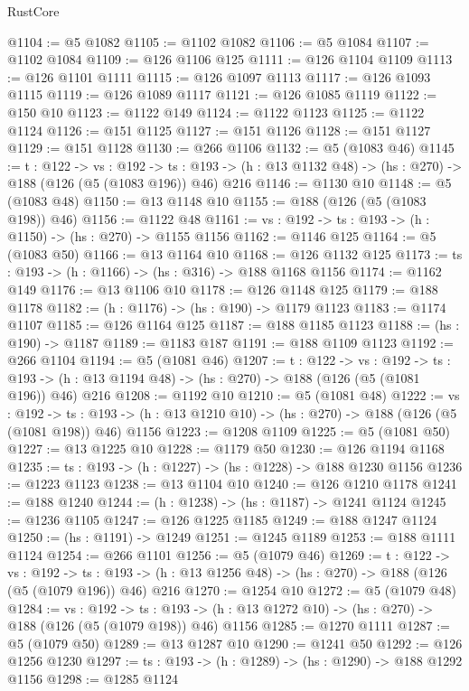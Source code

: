 \begin{lexlean}{RustCore}
\begin{coremodule}
@1104 := @5 @1082
@1105 := @1102 @1082
@1106 := @5 @1084
@1107 := @1102 @1084
@1109 := @126 @1106 @125
@1111 := @126 @1104 @1109
@1113 := @126 @1101 @1111
@1115 := @126 @1097 @1113
@1117 := @126 @1093 @1115
@1119 := @126 @1089 @1117
@1121 := @126 @1085 @1119
@1122 := @150 @10
@1123 := @1122 @149
@1124 := @1122 @1123
@1125 := @1122 @1124
@1126 := @151 @1125
@1127 := @151 @1126
@1128 := @151 @1127
@1129 := @151 @1128
@1130 := @266 @1106
@1132 := @5 (@1083 @46)
@1145 := {t : @122} ->
  {vs : @192} ->
  {ts : @193} -> (h : @13 @1132 @48) -> (hs : @270) -> @188 (@126 (@5 (@1083 @196)) @46) @216
@1146 := @1130 @10
@1148 := @5 (@1083 @48)
@1150 := @13 @1148 @10
@1155 := @188 (@126 (@5 (@1083 @198)) @46)
@1156 := @1122 @48
@1161 := {vs : @192} -> {ts : @193} -> (h : @1150) -> (hs : @270) -> @1155 @1156
@1162 := @1146 @125
@1164 := @5 (@1083 @50)
@1166 := @13 @1164 @10
@1168 := @126 @1132 @125
@1173 := {ts : @193} -> (h : @1166) -> (hs : @316) -> @188 @1168 @1156
@1174 := @1162 @149
@1176 := @13 @1106 @10
@1178 := @126 @1148 @125
@1179 := @188 @1178
@1182 := (h : @1176) -> (hs : @190) -> @1179 @1123
@1183 := @1174 @1107
@1185 := @126 @1164 @125
@1187 := @188 @1185 @1123
@1188 := (hs : @190) -> @1187
@1189 := @1183 @187
@1191 := @188 @1109 @1123
@1192 := @266 @1104
@1194 := @5 (@1081 @46)
@1207 := {t : @122} ->
  {vs : @192} ->
  {ts : @193} -> (h : @13 @1194 @48) -> (hs : @270) -> @188 (@126 (@5 (@1081 @196)) @46) @216
@1208 := @1192 @10
@1210 := @5 (@1081 @48)
@1222 := {vs : @192} ->
  {ts : @193} -> (h : @13 @1210 @10) -> (hs : @270) -> @188 (@126 (@5 (@1081 @198)) @46) @1156
@1223 := @1208 @1109
@1225 := @5 (@1081 @50)
@1227 := @13 @1225 @10
@1228 := @1179 @50
@1230 := @126 @1194 @1168
@1235 := {ts : @193} -> (h : @1227) -> (hs : @1228) -> @188 @1230 @1156
@1236 := @1223 @1123
@1238 := @13 @1104 @10
@1240 := @126 @1210 @1178
@1241 := @188 @1240
@1244 := (h : @1238) -> (hs : @1187) -> @1241 @1124
@1245 := @1236 @1105
@1247 := @126 @1225 @1185
@1249 := @188 @1247 @1124
@1250 := (hs : @1191) -> @1249
@1251 := @1245 @1189
@1253 := @188 @1111 @1124
@1254 := @266 @1101
@1256 := @5 (@1079 @46)
@1269 := {t : @122} ->
  {vs : @192} ->
  {ts : @193} -> (h : @13 @1256 @48) -> (hs : @270) -> @188 (@126 (@5 (@1079 @196)) @46) @216
@1270 := @1254 @10
@1272 := @5 (@1079 @48)
@1284 := {vs : @192} ->
  {ts : @193} -> (h : @13 @1272 @10) -> (hs : @270) -> @188 (@126 (@5 (@1079 @198)) @46) @1156
@1285 := @1270 @1111
@1287 := @5 (@1079 @50)
@1289 := @13 @1287 @10
@1290 := @1241 @50
@1292 := @126 @1256 @1230
@1297 := {ts : @193} -> (h : @1289) -> (hs : @1290) -> @188 @1292 @1156
@1298 := @1285 @1124

\end{coremodule}
\end{lexlean}
